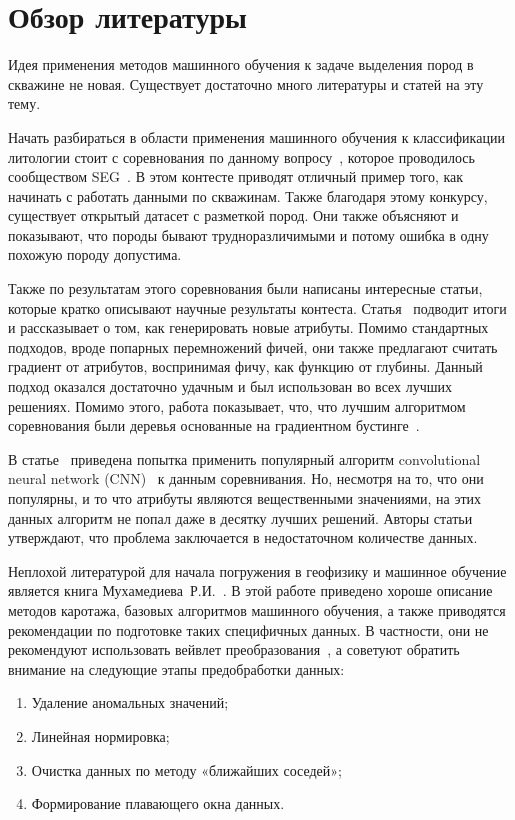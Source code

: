 \documentclass[aps,%
12pt,%
final,%
oneside,
onecolumn,%
musixtex, %
superscriptaddress,%
centertags]{article} %
\begin{document}
\section{Обзор литературы}
Идея применения методов машинного обучения к задаче выделения пород в скважине не новая. Существует достаточно много литературы и статей на эту тему.

Начать разбираться в области применения машинного обучения к классификации литологии стоит с соревнования по данному вопросу~\cite{SEG-contest}, которое проводилось сообществом SEG~\cite{SEG}. В этом контесте приводят отличный пример того, как начинать с работать данными по скважинам. Также благодаря этому конкурсу, существует открытый датасет с разметкой пород. Они также объясняют и показывают, что породы бывают трудноразличимыми и потому ошибка в одну похожую породу допустима.

Также по результатам этого соревнования были написаны интересные статьи, которые кратко описывают научные результаты контеста. Статья~\cite{Bestagini2017a} подводит итоги и рассказывает о том, как генерировать новые атрибуты. Помимо стандартных подходов, вроде попарных перемножений фичей, они также предлагают считать градиент от атрибутов, воспринимая фичу, как функцию от глубины. Данный подход оказался достаточно удачным и был использован во всех лучших решениях. Помимо этого, работа показывает, что, что лучшим алгоритмом соревнования были деревья основанные на градиентном бустинге~\cite{xgboost}.

В статье~\cite{Tschannen2017} приведена попытка применить популярный алгоритм convolutional neural network (CNN)~\cite{cnn} к данным соревнивания. Но, несмотря на то, что они популярны, и то что атрибуты являются вещественными значениями, на этих данных алгоритм не попал даже в десятку лучших решений. Авторы статьи утверждают, что проблема заключается в недостаточном количестве данных.

Неплохой литературой для начала погружения в геофизику и машинное обучение является книга Мухамедиева~Р.И.~\cite{GeophysicsMLBook}. В этой работе приведено хороше описание методов каротажа, базовых алгоритмов машинного обучения, а также приводятся рекомендации по подготовке таких специфичных данных. В частности, они не рекомендуют использовать вейвлет преобразования~\cite{wavelet}, а советуют обратить внимание на следующие этапы предобработки данных:
\begin{enumerate}
  \item Удаление аномальных значений;
  \item Линейная нормировка;
  \item Очистка данных по методу «ближайших соседей»;
  \item Формирование плавающего окна данных.
\end{enumerate}
\end{document}
